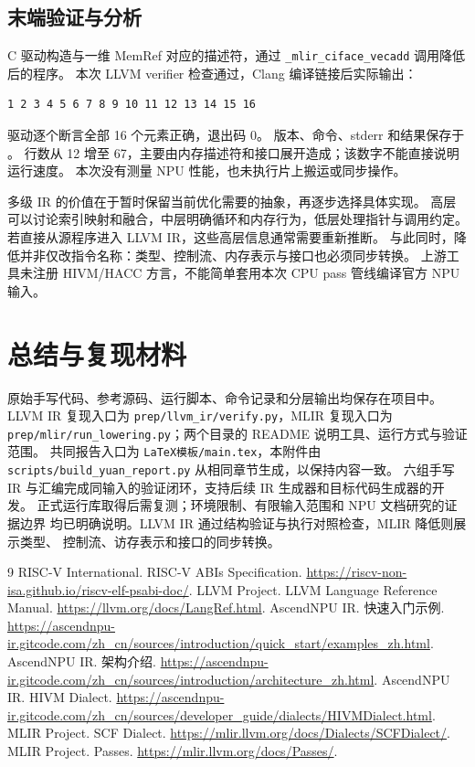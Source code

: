 \documentclass[UTF8,a4paper,11pt]{ctexart}
\begin{document}
\subsection{末端验证与分析}
C 驱动构造与一维 MemRef 对应的描述符，通过
\texttt{\_mlir\_ciface\_vecadd} 调用降低后的程序。
本次 LLVM verifier 检查通过，Clang 编译链接后实际输出：
\par\vspace{0.7\baselineskip}\noindent\begin{minipage}[t]{\linewidth}
\begin{lstlisting}
1 2 3 4 5 6 7 8 9 10 11 12 13 14 15 16
\end{lstlisting}
\end{minipage}\par\vspace{0.5\baselineskip}
驱动逐个断言全部 16 个元素正确，退出码 0。
版本、命令、stderr 和结果保存于 。
行数从 12 增至 67，主要由内存描述符和接口展开造成；该数字不能直接说明运行速度。
本次没有测量 NPU 性能，也未执行片上搬运或同步操作。

多级 IR 的价值在于暂时保留当前优化需要的抽象，再逐步选择具体实现。
高层可以讨论索引映射和融合，中层明确循环和内存行为，低层处理指针与调用约定。
若直接从源程序进入 LLVM IR，这些高层信息通常需要重新推断。
与此同时，降低并非仅改指令名称：类型、控制流、内存表示与接口也必须同步转换。
上游工具未注册 HIVM/HACC 方言，不能简单套用本次 CPU pass 管线编译官方 NPU 输入。

\section{总结与复现材料}
原始手写代码、参考源码、运行脚本、命令记录和分层输出均保存在项目中。
LLVM IR 复现入口为 \texttt{prep/llvm\_ir/verify.py}，MLIR 复现入口为
\texttt{prep/mlir/run\_lowering.py}；两个目录的 README 说明工具、运行方式与验证范围。
共同报告入口为 \texttt{LaTeX模板/main.tex}，本附件由
\texttt{scripts/build\_yuan\_report.py} 从相同章节生成，以保持内容一致。
六组手写 IR 与汇编完成同输入的验证闭环，支持后续 IR 生成器和目标代码生成器的开发。
正式运行库取得后需复测；环境限制、有限输入范围和 NPU 文档研究的证据边界
均已明确说明。LLVM IR 通过结构验证与执行对照检查，MLIR 降低则展示类型、
控制流、访存表示和接口的同步转换。

\newpage
\begin{thebibliography}{9}
 RISC-V International. RISC-V ABIs Specification. \url{https://riscv-non-isa.github.io/riscv-elf-psabi-doc/}.
 LLVM Project. LLVM Language Reference Manual. \url{https://llvm.org/docs/LangRef.html}.
 AscendNPU IR. 快速入门示例. \url{https://ascendnpu-ir.gitcode.com/zh_cn/sources/introduction/quick_start/examples_zh.html}.
 AscendNPU IR. 架构介绍. \url{https://ascendnpu-ir.gitcode.com/zh_cn/sources/introduction/architecture_zh.html}.
 AscendNPU IR. HIVM Dialect. \url{https://ascendnpu-ir.gitcode.com/zh_cn/sources/developer_guide/dialects/HIVMDialect.html}.
 MLIR Project. SCF Dialect. \url{https://mlir.llvm.org/docs/Dialects/SCFDialect/}.
 MLIR Project. Passes. \url{https://mlir.llvm.org/docs/Passes/}.
\end{thebibliography}
\end{document}
